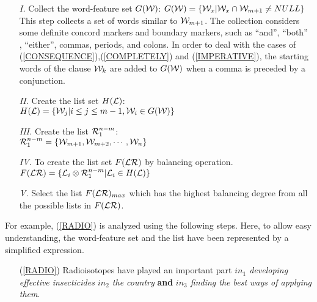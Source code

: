 \begin{itemize}  \item[\sl I.] 
Collect the word-feature set $G({\cal W})$: $G({\cal W}) = \{{\cal
W}_{x} | {\cal W}_{x} \cap {\cal W}_{m+1} \neq NULL \}$\\
This step collects a set of words similar to ${\cal W}_{m+1}$.
The collection considers some definite concord markers and boundary
markers, such as ``and'', ``both'' , ``either'', commas, periods, and
colons. 
In order to deal with the cases of
(\ref{CONSEQUENCE}),(\ref{COMPLETELY}) and (\ref{IMPERATIVE}), the
starting words of the clause ${\cal W}_{k}$ are added to $G({\cal W})$
when a comma is preceded by a conjunction.
\item[\sl II.] Create the list set $H({\cal L})$: \\
$
H({\cal L}) =  \{{\cal W}_{j}| i \leq j \leq m-1, {\cal W}_{i} \in
G({\cal W})\}$
\item[\sl III.] Create the list ${\cal R}_{1}^{n-m}$: \\
$
{\cal R}_{1}^{n-m} =  \{{\cal W}_{m+1},{\cal W}_{m+2},\cdots,{\cal W}_{n}\}
$
 \item[\sl IV.] To create the list set $F({\cal LR})$ by balancing
operation. \\
$
F({\cal LR})  =  \{ {\cal L}_{i} \otimes {\cal R}_{1}^{n-m} |
{\cal L}_{i} \in H({\cal L})   \}
$
 \item[\sl V.]
Select the list $F({\cal LR})_{max}$ which has the highest balancing 
degree from all the possible lists in $F({\cal LR})$.
\end{itemize}

For example, (\ref{RADIO}) is analyzed using the following steps. Here,
to allow easy understanding, the word-feature set and the list have been
represented by a simplified expression.

\begin{itemize}
    \item[(\ref{RADIO})] Radioisotopes have played an important part
{\sl $in_{1}$ developing effective insecticides $in_{2}$ the country}
{\bf and} {\sl $in_{3}$ finding the best ways of applying them}.
\end{itemize}



